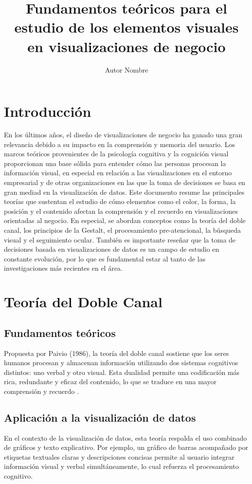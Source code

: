 \documentclass[12pt]{article}
\title{Fundamentos teóricos para el estudio de los elementos visuales en visualizaciones de negocio}
\author{Autor Nombre}
\begin{document}
\maketitle
\onehalfspacing

\section{Introducción}
En los últimos años, el diseño de visualizaciones de negocio ha ganado una gran relevancia debido a su impacto en la comprensión y memoria del usuario. Los marcos teóricos provenientes de la psicología cognitiva y la cognición visual proporcionan una base sólida para entender cómo las personas procesan la información visual, en especial en relación a las visualizaciones en el entorno empresarial y de otras organizaciones en las que la toma de decisiones se basa en gran mediad en la visualización de datos. Este documento resume las principales teorías que sustentan el estudio de cómo elementos como el color, la forma, la posición y el contenido afectan la comprensión y el recuerdo en visualizaciones orientadas al negocio. En especial, se abordan conceptos como la teoría del doble canal, los principios de la Gestalt, el procesamiento pre-atencional, la búsqueda visual y el seguimiento ocular. También es importante reseñar que la toma de decisiones basada en visualizaciones de datos es un campo de estudio en constante evolución, por lo que es fundamental estar al tanto de las investigaciones más recientes en el área.

\section{Teoría del Doble Canal}

\subsection{Fundamentos teóricos}
Propuesta por Paivio (1986), la teoría del doble canal sostiene que los seres humanos procesan y almacenan información utilizando dos sistemas cognitivos distintos: uno verbal y otro visual. Esta dualidad permite una codificación más rica, redundante y eficaz del contenido, lo que se traduce en una mayor comprensión y recuerdo \parencite{paivio1986}.

\subsection{Aplicación a la visualización de datos}
En el contexto de la visualización de datos, esta teoría respalda el uso combinado de gráficos y texto explicativo. Por ejemplo, un gráfico de barras acompañado por etiquetas textuales claras y descripciones concisas permite al usuario integrar información visual y verbal simultáneamente, lo cual refuerza el procesamiento cognitivo.
\end{document}
